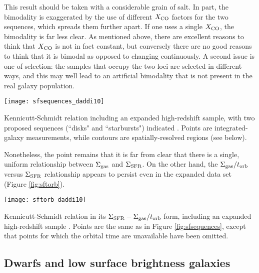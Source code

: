 This result should be taken with a considerable grain of salt. In part, the bimodality is exaggerated by the use of different $X_{\rm CO}$ factors for the two sequences, which spreads them further apart. If one uses a single $X_{\rm CO}$, the bimodality is far less clear. As mentioned above, there are excellent reasons to think that $X_{\rm CO}$ is not in fact constant, but conversely there are no good reasons to think that it is bimodal as opposed to changing continuously. A second issue is one of selection: the samples that occupy the two loci are selected in different ways, and this may well lead to an artificial bimodality that is not present in the real galaxy population.
\begin{marginfigure}
\texttt{[image: sfsequences\_daddi10]}
\caption[Kennicutt-Schmidt relation, with additional high-redshift data]{
\label{fig:sfsequences}
Kennicutt-Schmidt relation including an expanded high-redshift sample, with two proposed sequences (``disks" and ``starbursts") indicated \citet{daddi10a}. Points are integrated-galaxy measurements, while contours are spatially-resolved regions (see below).
}
\end{marginfigure}

Nonetheless, the point remains that it is far from clear that there is a single, uniform relationship between $\Sigma_{\rm gas}$ and $\Sigma_{\rm SFR}$. On the other hand, the $\Sigma_{\rm gas}/t_{\rm orb}$ versus $\Sigma_{\rm SFR}$ relationship appears to persist even in the expanded data set (Figure \ref{fig:sftorb}).
\begin{marginfigure}
\texttt{[image: sftorb\_daddi10]}
\caption[Kennicutt-Schmidt relation, orbital time version, with additional high-redshift data]{
\label{fig:sftorb}
Kennicutt-Schmidt relation in its $\Sigma_{\rm SFR}-\Sigma_{\rm gas}/t_{\rm orb}$ form, including an expanded high-redshift sample \citet{daddi10a}. Points are the same as in Figure \ref{fig:sfsequences}, except that points for which the orbital time are unavailable have been omitted.
}
\end{marginfigure}

\subsection{Dwarfs and low surface brightness galaxies}

